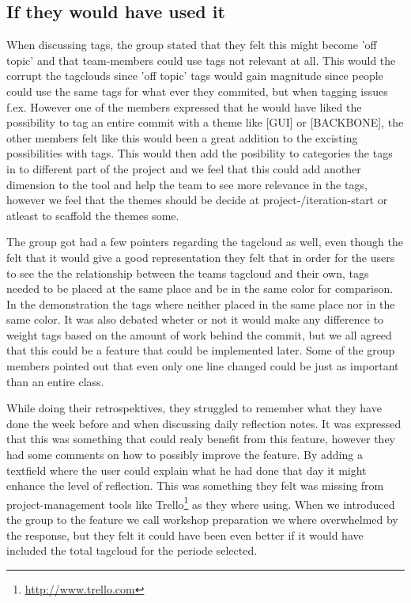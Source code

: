 \subsection{If they would have used it}
When discussing tags, the group stated that they felt this might become 'off topic' and that team-members could use tags not relevant at all. This would the corrupt the tagclouds since 'off topic' tags would gain magnitude since people could use the same tags for what ever they commited, but when tagging issues f.ex. However one of the members expressed that he would have liked the possibility to tag an entire commit with a theme like [GUI] or [BACKBONE], the other members felt like this would been a great addition to the excisting possibilities with tags. This would then add the posibility to categories the tags in to different part of the project and we feel that this could add another dimension to the tool and help the team to see more relevance in the tags, however we feel that the themes should be decide at project-/iteration-start or atleast to scaffold the themes some.

The group got had a few pointers regarding the tagcloud as well, even though the felt that it would give a good representation they felt that in order for the users to see the the relationship between the teams tagcloud and their own, tags needed to be placed at the same place and be in the same color for comparison. In the demonstration the tags where neither placed in the same place nor in the same color. It was also debated wheter or not it would make any difference to weight tags based on the amount of work behind the commit, but we all agreed that this could be a feature that could be implemented later. Some of the group members pointed out that even only one line changed could be just as important than an entire class.

While doing their retrospektives, they struggled to remember what they have done the week before and when discussing daily reflection notes. It was expressed that this was something that could realy benefit from this feature, however they had some comments on how to possibly improve the feature. By adding a textfield where the user could explain what he had done that day it might enhance the level of reflection. This was something they felt was missing from project-management tools like Trello\footnote{\url{http://www.trello.com}} as they where using. When we introduced the group to the feature we call workshop preparation we where overwhelmed by the response, but they felt it could have been even better if it would have included the total tagcloud for the periode selected.

